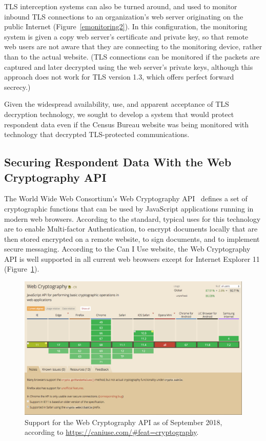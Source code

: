 \documentclass[fleqn,10pt]{wlscirep}
\begin{document}
TLS interception systems can also be turned around, and used to
monitor inbound TLS connections to an organization's web server
originating on the public Internet
(Figure~\ref{emonitoring2}). In this configuration, the monitoring
system is given a copy web server's certificate and private key, so
that remote web users are not aware that they are connecting to the
monitoring device, rather than to the actual website. (TLS connections can be
monitored if the packets are captured and later decrypted using
the web server's private keys, although this approach does not work
for TLS version 1.3, which offers perfect forward secrecy.)

Given the widespread availability, use, and apparent acceptance of TLS
decryption technology, we sought to develop a system that would
protect respondent data even if the Census Bureau website was being
monitored with technology that decrypted TLS-protected communications. 
 
\subsection{Securing Respondent Data With the Web Cryptography API}

The World Wide Web Consortium's Web Cryptography API~\cite{wcapi}
defines a set of cryptographic functions that can be used by
JavaScript applications running in modern web browsers. According to the
standard, typical uses for this technology are to enable Multi-factor
Authentication, to encrypt documents locally that are then stored
encrypted on a remote website, to sign documents, and to implement
secure messaging. According to the Can I Use website, the Web
Cryptography API is well supported in all current web browsers except
for Internet Explorer 11 (Figure~\ref{caniuse}).

\begin{figure}
  \includegraphics[width=\linewidth]{art/caniuse}
  \caption{Support for the Web Cryptography API as of September 2018,
    according to \url{https://caniuse.com/\#feat=cryptography}.\label{caniuse}}
\end{figure}
\end{document}
